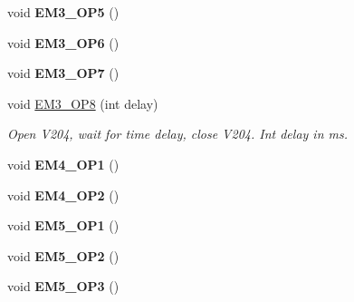 \begin{DoxyCompactItemize}
\item 
\mbox{\label{class_a_s_e6030_1_1_controller_a36821d2fcf2823a14d968d76c7746f56}} 
void {\bfseries E\+M3\+\_\+\+O\+P5} ()
\item 
\mbox{\label{class_a_s_e6030_1_1_controller_a2375462bbd5c285383a163bcdc863cb1}} 
void {\bfseries E\+M3\+\_\+\+O\+P6} ()
\item 
\mbox{\label{class_a_s_e6030_1_1_controller_a876559042576cdad5b618af7c0027e3f}} 
void {\bfseries E\+M3\+\_\+\+O\+P7} ()
\item 
\mbox{\label{class_a_s_e6030_1_1_controller_a3e7140dbb56a32c9eb13c4b194042901}} 
void \hyperlink{class_a_s_e6030_1_1_controller_a3e7140dbb56a32c9eb13c4b194042901}{E\+M3\+\_\+\+O\+P8} (int delay)
\begin{DoxyCompactList}\small\item\em Open V204, wait for time delay, close V204. Int delay in ms. \end{DoxyCompactList}\item 
\mbox{\label{class_a_s_e6030_1_1_controller_a6d62a17fc0600c10bfd805275efe8615}} 
void {\bfseries E\+M4\+\_\+\+O\+P1} ()
\item 
\mbox{\label{class_a_s_e6030_1_1_controller_a7e83967562237044f564c5dab7020f0a}} 
void {\bfseries E\+M4\+\_\+\+O\+P2} ()
\item 
\mbox{\label{class_a_s_e6030_1_1_controller_aac309fed5ac5a1e1b14c91f0bc74384a}} 
void {\bfseries E\+M5\+\_\+\+O\+P1} ()
\item 
\mbox{\label{class_a_s_e6030_1_1_controller_ac1e21b41f4b6fd90dec2d942f3370183}} 
void {\bfseries E\+M5\+\_\+\+O\+P2} ()
\item 
\mbox{\label{class_a_s_e6030_1_1_controller_a3db5e3e582ab32c0e112f5d23c0e0e52}} 
void {\bfseries E\+M5\+\_\+\+O\+P3} ()
\item 
\mbox{\label{class_a_s_e6030_1_1_controller_ae24a7fd26d6686a1d7e2d1637df01b3d}} 

\end{DoxyCompactItemize}
